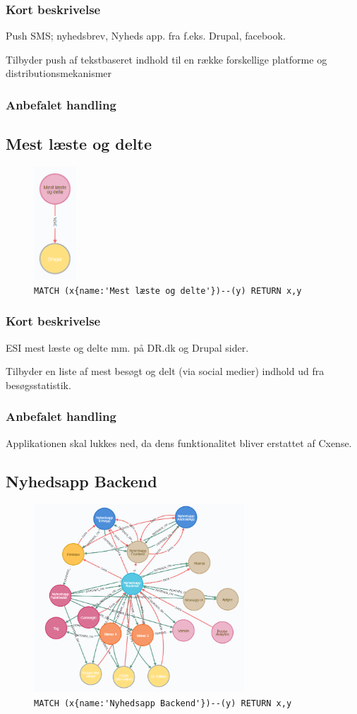 \documentclass{article}
\begin{document}
\subsubsection*{Kort beskrivelse}
Push SMS; nyhedsbrev, Nyheds app. fra f.eks. Drupal, facebook.

Tilbyder push af tekstbaseret indhold til en række forskellige platforme og distributionsmekanismer
\subsubsection*{Anbefalet handling}



\subsection{Mest læste og delte}
\begin{figure}[H]
\includegraphics[height=120pt]{MestL.PNG}
\cprotect\caption{\verb|MATCH (x{name:'Mest læste og delte'})--(y) RETURN x,y|}
\end{figure}
\subsubsection*{Kort beskrivelse}
ESI mest læste og delte mm. på DR.dk og Drupal sider.

Tilbyder en liste af mest besøgt og delt (via social medier) indhold ud fra besøgsstatistik.
\subsubsection*{Anbefalet handling}
Applikationen skal lukkes ned, da dens funktionalitet bliver erstattet af Cxense.



\subsection{Nyhedsapp Backend}
\begin{figure}[H]
\includegraphics[height=200pt]{NyhedsappBE.PNG}
\cprotect\caption{\verb|MATCH (x{name:'Nyhedsapp Backend'})--(y) RETURN x,y|}
\end{figure}
\end{document}
